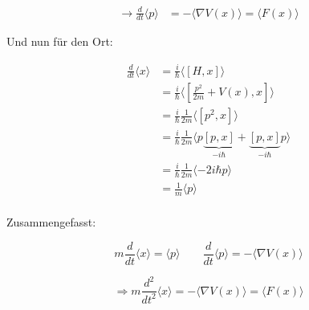 \begin{align}
\rightarrow \frac{d}{dt} \langle p \rangle  &=  -\langle  \nabla V(x) \rangle = \langle F(x) \rangle  
\end{align}

Und nun für den Ort:

\begin{align}
 \frac{d}{dt} \langle x \rangle  &= \frac{i}{\hbar} \langle [H,x]\rangle \\
&= \frac{i}{\hbar} \langle [\frac{p^2}{2m}+V(x),x]\rangle   \\
&= \frac{i}{\hbar}\frac{1}{2m} \langle [p^2,x]\rangle   \\
&= \frac{i}{\hbar}\frac{1}{2m} \langle p\underbrace{ [p,x]}_{-i\hbar}+\underbrace{ [p,x]}_{-i\hbar}p\rangle   \\
&= \frac{i}{\hbar}\frac{1}{2m} \langle -2i\hbar p\rangle   \\
&= \frac{1}{m} \langle p \rangle   \\
\end{align}

Zusammengefasst:

\[ m \frac{d}{dt} \langle x \rangle  = \langle p \rangle \qquad \frac{d}{dt} \langle p \rangle  =  -\langle  \nabla V(x) \rangle \]


\[ \Rightarrow m \frac{d^2}{dt^2} \langle x \rangle  =  -\langle  \nabla V(x) \rangle =  \langle F(x) \rangle \]





